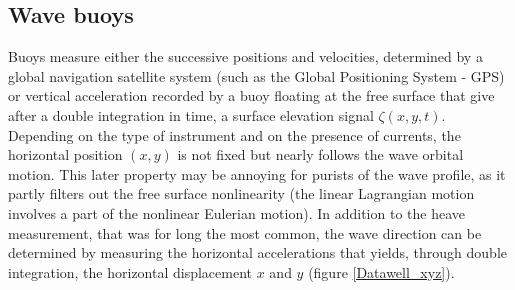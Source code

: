   \subsection{Wave buoys}
    Buoys measure either the successive positions and velocities, determined by a global navigation satellite system (such as the Global Positioning System - GPS) or 
    vertical acceleration recorded by a buoy floating at the free surface that give after a double integration in time, 
  a surface elevation signal $\zeta(x,y,t)$. Depending on the type of instrument and on the presence of currents, the horizontal position $(x,y)$ is not fixed but 
  nearly follows the wave orbital 
motion. This later property may be annoying for purists of the wave profile, as it partly filters out the free surface nonlinearity (the linear 
Lagrangian motion involves a part of the nonlinear Eulerian motion). In addition to the heave measurement, that was for long the most common, the wave 
direction can be determined by measuring the horizontal accelerations that yields, through double integration, the horizontal displacement $x$ 
and $y$ (figure \ref{Datawell_xyz}). 
